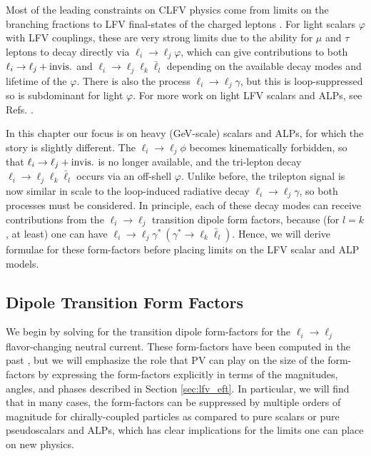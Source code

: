 Most of the leading constraints on CLFV physics come from limits on the branching fractions to LFV final-states of the charged leptons \cite{Marciano:2008zz, Davidson:2022jai}. For light scalars $\varphi$ with LFV couplings, these are very strong limits due to the ability for $\mu$ and $\tau$ leptons to decay directly via $\ell_i \rightarrow \ell_j\varphi$, which can give contributions to both $\ell_i\rightarrow \ell_j+{\rm invis.}$ and $\ell_i \rightarrow \ell_j \ell_k \bar{\ell}_l$ depending on the available decay modes and lifetime of the $\varphi$. There is also the process $\ell_i\rightarrow \ell_j\gamma$, but this is loop-suppressed so is subdominant for light $\varphi$. For more work on light LFV scalars and ALPs, see Refs. \cite{Calibbi:2016hwq,Escribano:2020wua}.

In this chapter our focus is on heavy (GeV-scale) scalars and ALPs, for which the story is slightly different. The $\ell_i \rightarrow \ell_j\phi$ becomes kinematically forbidden, so that $\ell_i \rightarrow \ell_j+{\rm invis.}$ is no longer available, and the tri-lepton decay $\ell_i \rightarrow \ell_j \ell_k\bar{\ell}_l$ occurs via an off-shell $\varphi$. Unlike before, the trilepton signal is now similar in scale to the loop-induced radiative decay $\ell_i \rightarrow \ell_j\gamma$, so both processes must be considered. In principle, each of these decay modes can receive contributions from the $\ell_i \rightarrow \ell_j$ transition dipole form factors,
because (for $l = k$, at least) one can have $\ell_i \rightarrow \ell_j\gamma^*~(\gamma^*\rightarrow \ell_k\bar{\ell}_l)$. Hence, we will derive formulae for these form-factors before placing limits on the LFV scalar and ALP models.

\subsection{Dipole Transition Form Factors}\label{sec:transition_ff}


We begin by solving for the transition dipole form-factors for the $\ell_i\rightarrow\ell_j$ flavor-changing neutral current. These form-factors have been computed in the past \cite{Escribano:2020wua,Cornella:2019uxs,Bauer:2021mvw}, but we will emphasize the role that PV can play on the size of the form-factors by expressing the form-factors explicitly in terms of the magnitudes, angles, and phases described in  Section \ref{sec:lfv_eft}. In particular, we will find that in many cases, the form-factors can be suppressed by multiple orders of magnitude for chirally-coupled particles as compared to pure scalars or pure pseudoscalars and ALPs, which has clear implications for the limits one can place on new physics.


